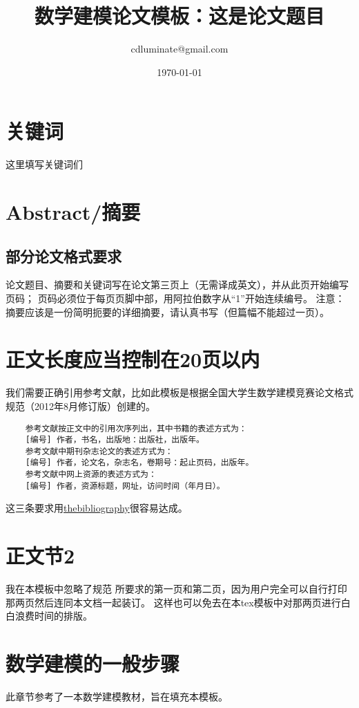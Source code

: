 \documentclass[10pt,a4paper]{article}
\title{数学建模论文模板：这是论文题目}
\author{cdluminate@gmail.com}
\date{\today}
\begin{document}
\begin{CJK}{UTF8}{gbsn}
\thispagestyle{empty}
\maketitle

\section*{关键词}
这里填写关键词们

\section*{Abstract/摘要}
\subsection*{部分论文格式要求}
论文题目、摘要和关键词写在论文第三页上（无需译成英文），并从此页开始编写页码；
页码必须位于每页页脚中部，用阿拉伯数字从“1”开始连续编号。
注意：摘要应该是一份简明扼要的详细摘要，请认真书写（但篇幅不能超过一页）。

\newpage

\section{正文长度应当控制在20页以内}
我们需要正确引用参考文献，比如此模板是根据全国大学生数学建模竞赛论文格式规范（2012年8月修订版）\cite{bib:plate}创建的。
	\begin{verbatim}
	参考文献按正文中的引用次序列出，其中书籍的表述方式为：
	[编号] 作者，书名，出版地：出版社，出版年。
	参考文献中期刊杂志论文的表述方式为：
	[编号] 作者，论文名，杂志名，卷期号：起止页码，出版年。
	参考文献中网上资源的表述方式为：
	[编号] 作者，资源标题，网址，访问时间（年月日）。
	\end{verbatim}
这三条要求用\underline{thebibliography}很容易达成。

\section{正文节2}
我在本模板中忽略了规范\cite{bib:plate} 所要求的第一页和第二页，因为用户完全可以自行打印那两页然后连同本文档一起装订。
这样也可以免去在本tex模板中对那两页进行白白浪费时间的排版。

\section{数学建模的一般步骤}
此章节参考了一本数学建模教材\cite{bib:mm}，旨在填充本模板。

\end{CJK}
\end{document}
